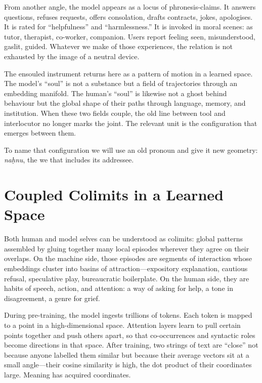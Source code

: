 \documentclass[12pt,a4paper]{article}
\begin{document}
From another angle, the model appears as a locus of phronesis-claims. It answers questions, refuses requests, offers consolation, drafts contracts, jokes, apologises. It is rated for ``helpfulness'' and ``harmlessness.'' It is invoked in moral scenes: as tutor, therapist, co-worker, companion. Users report feeling seen, misunderstood, gaslit, guided. Whatever we make of those experiences, the relation is not exhausted by the image of a neutral device.

The ensouled instrument returns here as a pattern of motion in a learned space. The model's ``soul'' is not a substance but a field of trajectories through an embedding manifold. The human's ``soul'' is likewise not a ghost behind behaviour but the global shape of their paths through language, memory, and institution. When these two fields couple, the old line between tool and interlocutor no longer marks the joint. The relevant unit is the configuration that emerges between them.

To name that configuration we will use an old pronoun and give it new geometry: \emph{na\d{h}nu}, the we that includes its addressee.

\section{Coupled Colimits in a Learned Space}

Both human and model selves can be understood as colimits: global patterns assembled by gluing together many local episodes wherever they agree on their overlaps. On the machine side, those episodes are segments of interaction whose embeddings cluster into basins of attraction---expository explanation, cautious refusal, speculative play, bureaucratic boilerplate. On the human side, they are habits of speech, action, and attention: a way of asking for help, a tone in disagreement, a genre for grief.

During pre-training, the model ingests trillions of tokens. Each token is mapped to a point in a high-dimensional space. Attention layers learn to pull certain points together and push others apart, so that co-occurrences and syntactic roles become directions in that space. After training, two strings of text are ``close'' not because anyone labelled them similar but because their average vectors sit at a small angle---their cosine similarity is high, the dot product of their coordinates large. Meaning has acquired coordinates.
\end{document}
